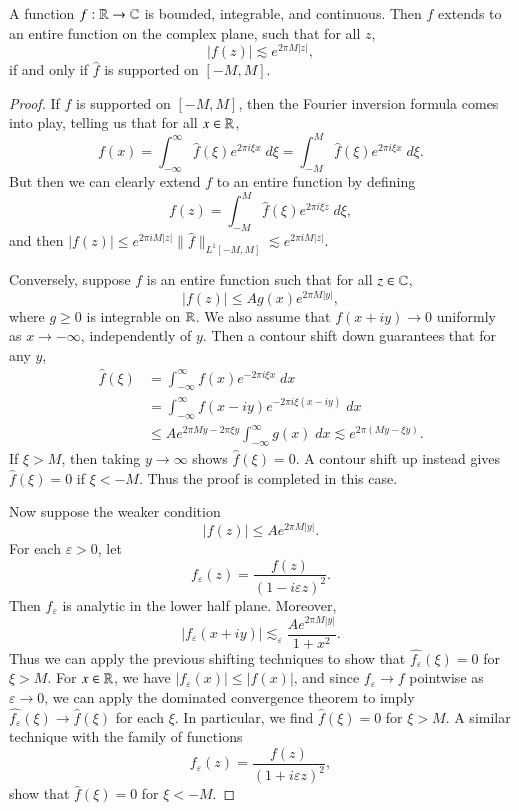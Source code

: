 \begin{theorem}
    A function $f: \operatorname{\mathbb{R}} \to \operatorname{\mathbb{C}}$ is bounded, integrable, and continuous. Then $f$ extends to an entire function on the complex plane, such that for all $z$,
    \[ |f(z)| \lesssim e^{2 \pi M |z|}, \]
    if and only if $\widehat{f}$ is supported on $[-M,M]$.
\end{theorem}
\begin{proof}
    If $\widehat{f}$ is supported on $[-M,M]$, then the Fourier inversion formula comes into play, telling us that for all $x \in \operatorname{\mathbb{R}}$,
    \[ f(x) = \int_{-\infty}^\infty \widehat{f}(\xi) e^{2 \pi i \xi x}\; d\xi = \int_{-M}^M \widehat{f}(\xi) e^{2 \pi i \xi x}\; d\xi. \]
    But then we can clearly extend $f$ to an entire function by defining
    \[ f(z) = \int_{-M}^M \widehat{f}(\xi) e^{2 \pi i \xi z}\; d\xi, \]
    and then $|f(z)| \leq e^{2 \pi i M |z|} \| \widehat{f} \|_{L^1[-M,M]} \lesssim e^{2 \pi i M |z|}$.

    Conversely, suppose $f$ is an entire function such that for all $z \in \operatorname{\mathbb{C}}$,
    \[ |f(z)| \leq A g(x) e^{2 \pi M |y|}, \]
    where $g \geq 0$ is integrable on $\operatorname{\mathbb{R}}$. We also assume that $f(x + iy) \to 0$ uniformly as $x \to -\infty$, independently of $y$. Then a contour shift down guarantees that for any $y$,
    \begin{align*}
        \widehat{f}(\xi) &= \int_{-\infty}^\infty f(x) e^{-2 \pi i \xi x}\; dx\\
        &= \int_{-\infty}^\infty f(x - iy) e^{-2 \pi i \xi (x - iy)}\; dx\\
        &\leq A e^{2 \pi M y - 2 \pi \xi y} \int_{-\infty}^\infty g(x) \; dx \lesssim e^{2 \pi (M y - \xi y)}.
    \end{align*}
    If $\xi > M$, then taking $y \to \infty$ shows $\widehat{f}(\xi) = 0$. A contour shift up instead gives $\widehat{f}(\xi) = 0$ if $\xi < -M$. Thus the proof is completed in this case.

    Now suppose the weaker condition
    \[ |f(z)| \leq A e^{2 \pi M |y|}. \]    
    For each $\varepsilon > 0$, let
    \[ f_\varepsilon(z) = \frac{f(z)}{(1 - i\varepsilon z)^2}. \]
    Then $f_\varepsilon$ is analytic in the lower half plane. Moreover,
    \[ |f_\varepsilon(x + iy)| \lesssim_\varepsilon \frac{A e^{2\pi M |y|}}{1 + x^2}. \]
    Thus we can apply the previous shifting techniques to show that $\widehat{f_\varepsilon}(\xi) = 0$ for $\xi > M$. For $x \in \operatorname{\mathbb{R}}$, we have $|f_\varepsilon(x)| \leq |f(x)|$, and since $f_\varepsilon \to f$ pointwise as $\varepsilon \to 0$, we can apply the dominated convergence theorem to imply $\widehat{f_\varepsilon}(\xi) \to \widehat{f}(\xi)$ for each $\xi$. In particular, we find $\widehat{f}(\xi) = 0$ for $\xi > M$. A similar technique with the family of functions
    \[ f_\varepsilon(z) = \frac{f(z)}{(1 + i\varepsilon z)^2}, \] 
    show that $\widehat{f}(\xi) = 0$ for $\xi < -M$.


\end{proof}
